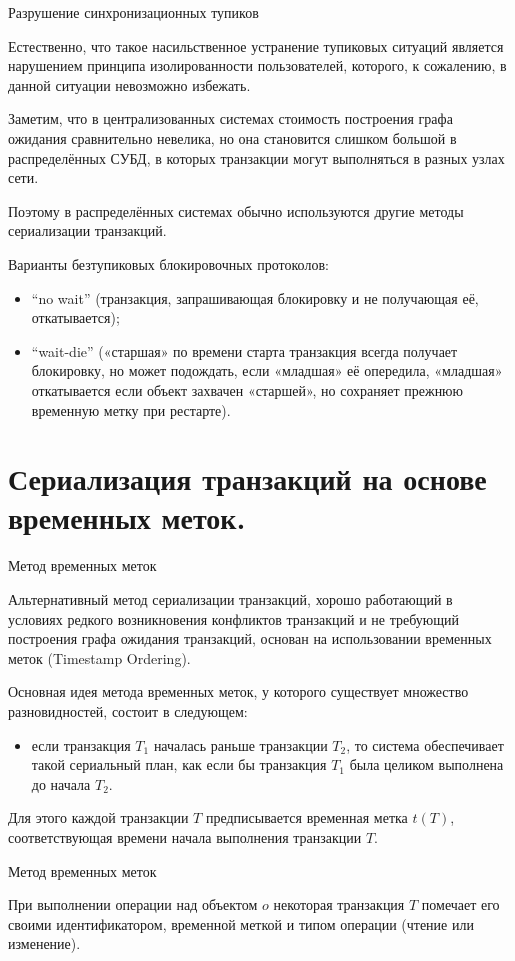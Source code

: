 \documentclass[a4paper,12pt]{article}
\begin{document}
Разрушение синхронизационных тупиков

Естественно, что такое насильственное устранение тупиковых ситуаций является нарушением принципа изолированности пользователей, которого, к сожалению, в данной ситуации невозможно избежать.

Заметим, что в централизованных системах стоимость построения графа ожидания сравнительно невелика, но она становится слишком большой в распределённых СУБД, в которых транзакции могут выполняться в разных узлах сети.

Поэтому в распределённых системах обычно используются другие методы сериализации транзакций.

Варианты безтупиковых блокировочных протоколов:
\begin{itemize}
    \item “no wait” (транзакция, запрашивающая блокировку и не получающая её, откатывается);
    \item “wait-die” («старшая» по времени старта транзакция всегда получает блокировку, но может подождать, если «младшая» её опередила, «младшая» откатывается если объект захвачен «старшей», но сохраняет прежнюю временную метку при рестарте).
\end{itemize}

\section{Сериализация транзакций на основе временных меток.}
Метод временных меток

Альтернативный метод сериализации транзакций, хорошо работающий в условиях редкого возникновения конфликтов транзакций и не требующий построения графа ожидания транзакций, основан на использовании временных меток (Timestamp Ordering).

Основная идея метода временных меток, у которого существует множество разновидностей, состоит в следующем:
\begin{itemize}
    \item если транзакция $T_1$ началась раньше транзакции $T_2$, то система обеспечивает такой сериальный план, как если бы транзакция $T_1$ была целиком выполнена до начала $T_2$.
\end{itemize}

Для этого каждой транзакции $T$ предписывается временная метка $t(T)$, соответствующая времени начала выполнения транзакции $T$.

Метод временных меток

При выполнении операции над объектом $o$ некоторая транзакция $T$ помечает его своими идентификатором, временной меткой и типом операции (чтение или изменение).
\end{document}
